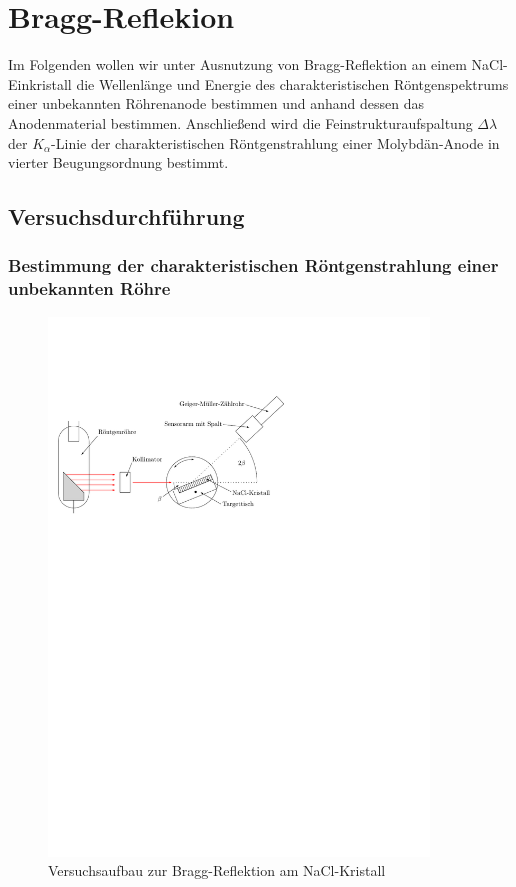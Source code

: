 \documentclass[10pt, a4paper]{article}
\begin{document}
\section{Bragg-Reflekion}
Im Folgenden wollen wir unter Ausnutzung von Bragg-Reflektion an einem NaCl-Einkristall die Wellenlänge und Energie des charakteristischen Röntgenspektrums einer unbekannten Röhrenanode bestimmen und anhand dessen das Anodenmaterial bestimmen.
Anschließend wird die Feinstrukturaufspaltung $\Delta \lambda$ der $K_\alpha$-Linie der charakteristischen Röntgenstrahlung einer Molybdän-Anode in vierter Beugungsordnung bestimmt.

\subsection{Versuchsdurchführung}
\subsubsection{Bestimmung der charakteristischen Röntgenstrahlung einer unbekannten Röhre}
\begin{figure}[h]
\centering
\includegraphics[width=0.9\textwidth]{./grafiken/aufbau_bragg.pdf}
\caption{Versuchsaufbau zur Bragg-Reflektion am NaCl-Kristall}
\label{fig:bragg_aufbau}
\end{figure}
\end{document}
